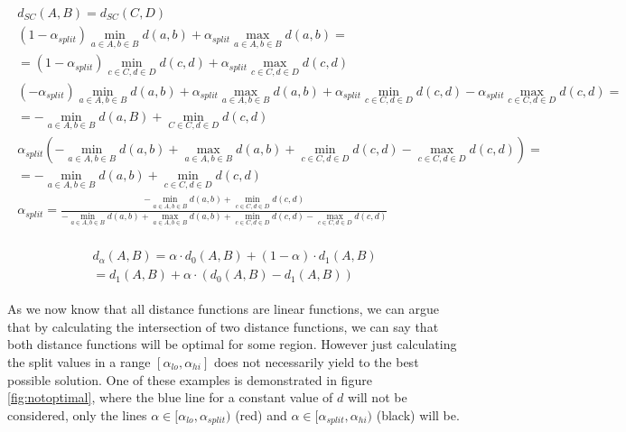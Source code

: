 \begin{equation}
    \begin{aligned}
        \begin{gathered}
        d_{SC}(A,B) = d_{SC}(C,D)\\
        (1 - \alpha_{split}) \min\limits_{a \in A, b \in B} d(a,b) + \alpha_{split} \max\limits_{a \in A, b \in B} d(a,b) = \\
        = (1 - \alpha_{split}) \min\limits_{c \in C, d \in D} d(c,d) + \alpha_{split} \max\limits_{c \in C, d \in D} d(c,d)\\
        (- \alpha_{split}) \min\limits_{a \in A, b \in B} d(a,b) + \alpha_{split} \max\limits_{a \in A, b \in B} d(a,b) + \alpha_{split} \min\limits_{c \in C, d \in D} d(c,d) - \alpha_{split} \max\limits_{c \in C, d \in D} d(c,d) =\\
        = - \min\limits_{a \in A, b \in B} d(a,B) + \min\limits_{C \in C, d \in D} d(c,d)\\
        \alpha_{split} (- \min\limits_{a \in A, b \in B} d(a,b) + \max\limits_{a \in A, b \in B} d(a,b) + \min\limits_{c \in C, d \in D} d(c,d) - \max\limits_{c \in C, d \in D} d(c,d)) =\\
        = - \min\limits_{a \in A, b \in B} d(a,b) + \min\limits_{c \in C, d \in D} d(c,d)\\
        \alpha_{split} = \frac{- \min\limits_{a \in A, b \in B} d(a,b) + \min\limits_{c \in C, d \in D} d(c,d)}{- \min\limits_{a \in A, b \in B} d(a,b) + \max\limits_{a \in A, b \in B} d(a,b) + \min\limits_{c \in C, d \in D} d(c,d) - \max\limits_{c \in C, d \in D} d(c,d)}
    \end{gathered}
    \end{aligned}
    \label{eq:equalizesc}
\end{equation}

\begin{equation}
    \begin{aligned}
        \begin{gathered}
        d_\alpha(A,B) = \alpha \cdot d_0(A,B) + (1-\alpha) \cdot d_1(A,B)\\
        = d_1(A,B) + \alpha \cdot (d_0(A,B) - d_1(A,B))
        \end{gathered}
    \end{aligned}
    \label{eq:linear}
\end{equation}

As we now know that all distance functions are linear functions, we can argue that by calculating the intersection of two distance functions, we can say that both distance functions will be optimal for some region. However just calculating the split values in a range $[\alpha_{lo}, \alpha_{hi}]$ does not necessarily yield to the best possible solution. One of these examples is demonstrated in figure \ref{fig:notoptimal}, where the blue line for a constant value of $d$ will not be considered, only the lines $\alpha \in [\alpha_{lo}, \alpha_{split})$ (red) and $\alpha \in [\alpha_{split}, \alpha_{hi})$ (black) will be.

